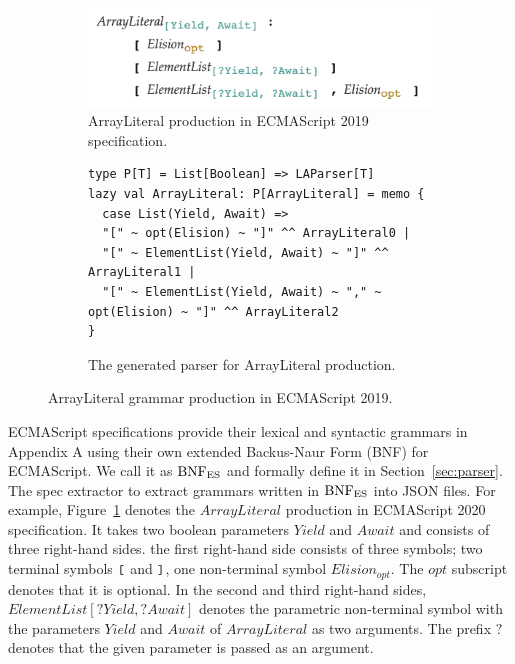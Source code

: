\begin{figure}
  \centering
  \begin{subfigure}[t]{0.4\textwidth}
    \includegraphics[width=\textwidth]{img/array_literal.png}
    \caption{ArrayLiteral production in ECMAScript 2019 specification.}
    \label{fig:array-literal-es}
  \end{subfigure}
  \begin{subfigure}[t]{0.48\textwidth}
    \begin{lstlisting}[style=myScalastyle]
type P[T] = List[Boolean] => LAParser[T]
lazy val ArrayLiteral: P[ArrayLiteral] = memo {
  case List(Yield, Await) =>
  "[" ~ opt(Elision) ~ "]" ^^ ArrayLiteral0 |
  "[" ~ ElementList(Yield, Await) ~ "]" ^^ ArrayLiteral1 |
  "[" ~ ElementList(Yield, Await) ~ "," ~ opt(Elision) ~ "]" ^^ ArrayLiteral2
}
    \end{lstlisting}
    \caption{The generated parser for ArrayLiteral production.}
    \label{fig:array-literal-parser}
  \end{subfigure}
  \caption{ArrayLiteral grammar production in ECMAScript 2019.}
  \label{fig:array-literal}
\end{figure}

ECMAScript specifications provide their lexical and syntactic grammars in Appendix A
using their own extended Backus-Naur Form (BNF) for ECMAScript.
We call it as \( \text{BNF}_{\text{ES}} \) and formally define it in Section~\ref{sec:parser}.
The spec extractor to extract grammars written in \( \text{BNF}_{\text{ES}} \) into JSON files.
For example, Figure~\ref{fig:array-literal-es} denotes the \( ArrayLiteral \) production
in ECMAScript 2020 specification. It takes two boolean parameters
\( Yield \) and \( Await \) and consists of three right-hand sides.
the first right-hand side consists of three symbols; two terminal symbols \( \texttt{\small[} \) and
\( \texttt{\small]} \), one non-terminal symbol \( Elision_{opt} \). The \( opt \)
subscript denotes that it is optional. In the second and third right-hand sides,
\( ElementList[?Yield, ?Await] \) denotes the parametric non-terminal symbol
with the parameters \( Yield \) and \( Await \) of \( ArrayLiteral \) as two arguments.
The prefix \( ? \) denotes that the given parameter is passed as an argument.

